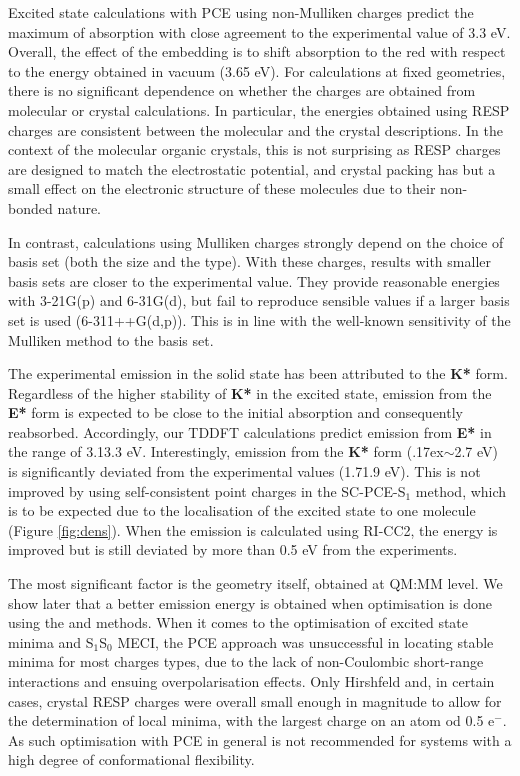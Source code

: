 Excited state calculations with PCE using non-Mulliken charges predict the maximum of absorption with close agreement to the experimental value of 3.3 eV. Overall, the effect of the embedding is to shift absorption to the red with respect to the energy obtained in vacuum (3.65 eV). For calculations at fixed geometries, there is no significant dependence on whether the charges are obtained from molecular or crystal calculations. In particular, the energies obtained using RESP charges are consistent between the molecular and the crystal descriptions. In the context of the molecular organic crystals, this is not surprising as RESP charges are designed to match the electrostatic potential, and crystal packing has but a small effect on the electronic structure of these molecules due to their non-bonded nature.

In contrast, calculations using Mulliken charges strongly depend on the choice of basis set (both the size and the type). With these charges, results with smaller basis sets are closer to the experimental value. They provide reasonable energies with 3-21G(p) and 6-31G(d), but fail to reproduce sensible values if a larger basis set is used (6-311++G(d,p)). This is in line with the well-known sensitivity of the Mulliken method to the basis set.


The experimental emission in the solid state has been attributed to the \textbf{K*} form.\cite{Dommett2017c} Regardless of the higher stability of \textbf{K*} in the excited state, emission from the \textbf{E*} form is expected to be close to the initial absorption and consequently reabsorbed. Accordingly, our TDDFT calculations predict emission from \textbf{E*} in the range of 3.1\textendash{}3.3 eV. Interestingly, emission from the \textbf{K*} form ({\raise.17ex\hbox{$\scriptstyle\sim$}}2.7 eV) is significantly deviated from the experimental values (1.7\textendash{}1.9 eV).\cite{Zhang2015,Zahid2017} This is not improved by using self-consistent point charges in the SC-PCE-S$_1$ method, which is to be expected due to the localisation of the excited state to one molecule (Figure \ref{fig:dens}). When the emission is calculated using RI-CC2, the energy is improved but is still deviated by more than 0.5 eV from the experiments. 

The most significant factor is the geometry itself, obtained at QM:MM level. We show later that a better emission energy is obtained when optimisation is done using the \EEC{} and \SCEEC{} methods. When it comes to the optimisation of excited state minima and S$_1$\textendash{}S$_0$ MECI, the PCE approach was unsuccessful in locating stable minima for most charges types, due to the lack of non-Coulombic short-range interactions and ensuing overpolarisation effects. Only Hirshfeld and, in certain cases, crystal RESP charges were overall small enough in magnitude to allow for the determination of local minima, with the largest charge on an atom od 0.5 e$^-$. As such optimisation with PCE in general is not recommended for systems with a high degree of conformational flexibility.

